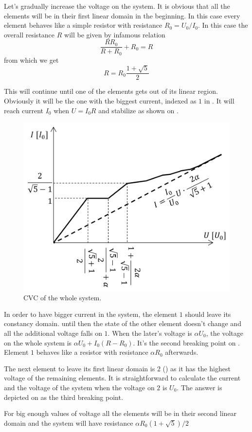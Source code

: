 Let's gradually increase the voltage on the system.
It is obvious that
all the elements will be in their first linear domain in the beginning.
In this case every element behaves like a simple resistor
with resistance $R_0 = U_0 / I_0$.
In this case the overall resistance $R$ will be given by infamous relation
\begin{equation}
    \frac{R R_0}{R + R_0} + R_0 = R
\end{equation}
from which we get
\begin{equation}
    R = R_0 \frac{1+\sqrt{5}}{2}
\end{equation}

This will continue until one of the elements
gets out of its linear region.
Obviously it will be the one with the biggest current,
indexed as $1$ in .
It will reach current $I_0$ when $U = I_0 R$ and stabilize
as shown on .

\begin{figure}
    \centering
    \vspace{-.5cm}
    \includegraphics[width = .5\textwidth]{S-2}
    \caption{CVC of the whole system.}
    \vspace{-.5cm}
\end{figure}

In order to have bigger current in the system,
the element $1$ should leave its constancy domain.
until then the state of the other element doesn't change
and all the additional voltage falls on $1$.
When the later's voltage is $\alpha U_0$,
the voltage on the whole system is $\alpha U_0 + I_0 (R - R_0)$.
It's the second breaking point on .
Element $1$ behaves like a resistor with resistance $\alpha R_0$ afterwards.

The next element to leave its first linear domain is $2$ ()
as it has the highest voltage of the remaining elements.
It is straightforward to calculate the current and the voltage of the system
when the voltage on $2$ is $U_0$.
The answer is depicted on  as the third breaking point.

For big enough values of voltage
all the elements will be in their second linear domain
and the system will have resistance $\alpha R_0 (1+\sqrt{5})/2$
